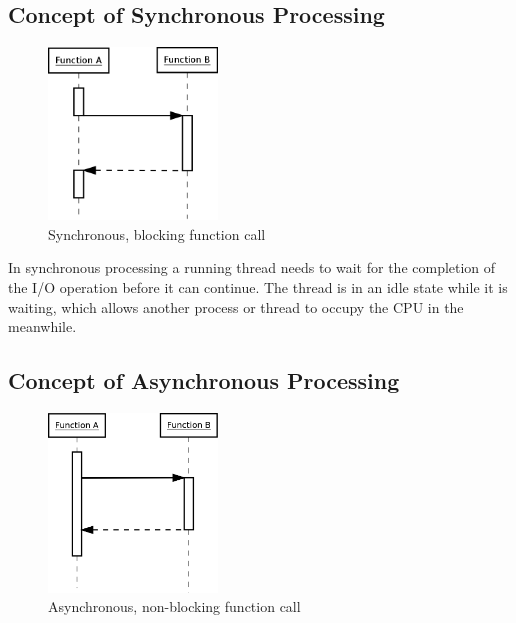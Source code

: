\subsection{Concept of Synchronous Processing}
\label{concept_sync}
\FloatBarrier

\begin{figure}[hbtp]
\centering
\includegraphics[width=0.4\textwidth]{img/synch_call.png}
\caption{Synchronous, blocking function call}
\label{fig:synch_call}
\end{figure}

In synchronous processing a running thread needs to wait for the completion of
the I/O operation before it can continue.
The thread is in an idle state while it is waiting, which allows another process 
or thread to occupy the CPU in the meanwhile.
\FloatBarrier
\subsection{Concept of Asynchronous Processing}
\label{concept_async}
\FloatBarrier

\begin{figure}[hbtp]
\centering
\includegraphics[width=0.4\textwidth]{img/asynch_call.png}
\caption{Asynchronous, non-blocking function call}
\label{fig:asynch_call}
\end{figure}


